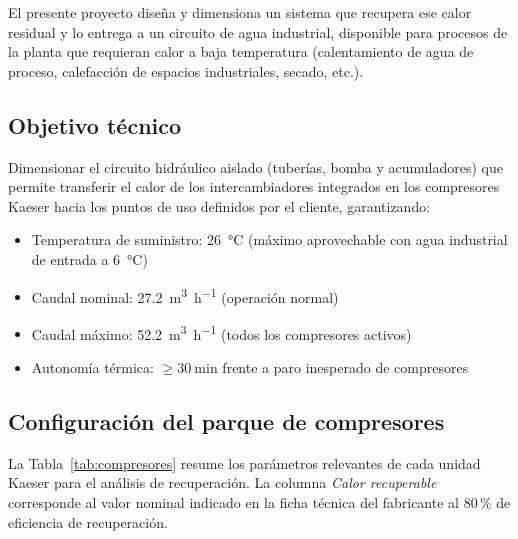 \documentclass[11pt,a4paper]{article}
\begin{document}
El presente proyecto diseña y dimensiona un sistema que recupera ese calor residual y lo
entrega a un circuito de agua industrial, disponible para procesos de la planta que
requieran calor a baja temperatura (calentamiento de agua de proceso, calefacción de
espacios industriales, secado, etc.).

\subsection{Objetivo técnico}

Dimensionar el circuito hidráulico aislado (tuberías, bomba y acumuladores) que permite
transferir el calor de los intercambiadores integrados en los compresores Kaeser hacia
los puntos de uso definidos por el cliente, garantizando:

\begin{itemize}
  \item Temperatura de suministro: \SI{26}{\celsius} (máximo aprovechable con
        agua industrial de entrada a \SI{6}{\celsius})
  \item Caudal nominal: \SI{27.2}{\cubic\metre\per\hour} (operación normal)
  \item Caudal máximo: \SI{52.2}{\cubic\metre\per\hour} (todos los compresores activos)
  \item Autonomía térmica: $\geq\SI{30}{\minute}$ frente a paro inesperado de compresores
\end{itemize}

\subsection{Configuración del parque de compresores}

La Tabla~\ref{tab:compresores} resume los parámetros relevantes de cada unidad
Kaeser para el análisis de recuperación. La columna \emph{Calor recuperable} corresponde
al valor nominal indicado en la ficha técnica del fabricante al 80\,\% de eficiencia de
recuperación.
\end{document}
